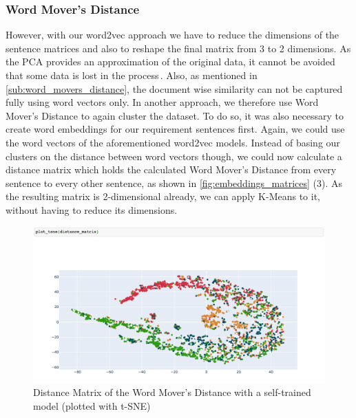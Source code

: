 \subsubsection{Word Mover's Distance} %
\label{sub:own_wmd}
However, with our word2vec approach we have to reduce the dimensions of the sentence matrices and also to reshape the final matrix from 3 to 2 dimensions. As the PCA provides an approximation of the original data, it cannot be avoided that some data is lost in the process\,\cite{wold_principal_1987}. Also, as mentioned in \autoref{sub:word_movers_distance}, the document wise similarity can not be captured fully using word vectors only.
In another approach, we therefore use Word Mover's Distance to again cluster the dataset. To do so, it was also necessary to create word embeddings for our requirement sentences first. Again, we could use the word vectors of the aforementioned word2vec models. Instead of basing our clusters on the distance between word vectors though, we could now calculate a distance matrix which holds the calculated Word Mover's Distance from every sentence to every other sentence, as shown in \autoref{fig:embeddings_matrices} (3). As the resulting matrix is 2-dimensional already, we can apply K-Means to it, without having to reduce its dimensions.

 \begin{figure}[ht]
  \begin{center}
    \includegraphics[width=\textwidth]{screenshots/our_word_movers_distance_tsne.png}
    \caption{Distance Matrix of the Word Mover's Distance with a self-trained model (plotted with t-SNE)}
    \label{fig:wmd-selftrained-1}
  \end{center}
\end{figure}
\FloatBarrier